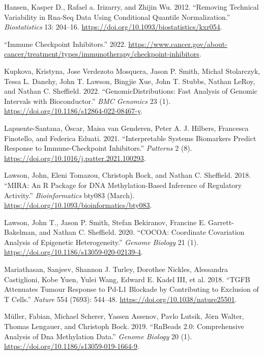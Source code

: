 \documentclass[]{article}
\newlength{\cslhangindent}
\newenvironment{cslreferences}%
  {\setlength{\parindent}{0pt}%
  \everypar{\setlength{\hangindent}{\cslhangindent}}\ignorespaces}%
  {\par}
\begin{document}
\begin{cslreferences}
\leavevmode\hypertarget{ref-Hansen2012}{}%
Hansen, Kasper D., Rafael a. Irizarry, and Zhijin Wu. 2012. ``Removing Technical Variability in Rna-Seq Data Using Conditional Quantile Normalization.'' \emph{Biostatistics} 13: 204--16. \url{https://doi.org/10.1093/biostatistics/kxr054}.

\leavevmode\hypertarget{ref-ICBnci}{}%
``Immune Checkpoint Inhibitors.'' 2022. \url{https://www.cancer.gov/about-cancer/treatment/types/immunotherapy/checkpoint-inhibitors}.

\leavevmode\hypertarget{ref-Kupkova2022}{}%
Kupkova, Kristyna, Jose Verdezoto Mosquera, Jason P. Smith, Michał Stolarczyk, Tessa L. Danehy, John T. Lawson, Bingjie Xue, John T. Stubbs, Nathan LeRoy, and Nathan C. Sheffield. 2022. ``GenomicDistributions: Fast Analysis of Genomic Intervals with Bioconductor.'' \emph{BMC Genomics} 23 (1). \url{https://doi.org/10.1186/s12864-022-08467-y}.

\leavevmode\hypertarget{ref-easierPap}{}%
Lapuente-Santana, Óscar, Maisa van Genderen, Peter A. J. Hilbers, Francesca Finotello, and Federica Eduati. 2021. ``Interpretable Systems Biomarkers Predict Response to Immune-Checkpoint Inhibitors.'' \emph{Patterns} 2 (8). \url{https://doi.org/10.1016/j.patter.2021.100293}.

\leavevmode\hypertarget{ref-Lawson2018}{}%
Lawson, John, Eleni Tomazou, Christoph Bock, and Nathan C. Sheffield. 2018. ``MIRA: An R Package for DNA Methylation-Based Inference of Regulatory Activity.'' \emph{Bioinformatics} bty083 (March). \url{https://doi.org/10.1093/bioinformatics/bty083}.

\leavevmode\hypertarget{ref-Lawson2020}{}%
Lawson, John T., Jason P. Smith, Stefan Bekiranov, Francine E. Garrett-Bakelman, and Nathan C. Sheffield. 2020. ``COCOA: Coordinate Covariation Analysis of Epigenetic Heterogeneity.'' \emph{Genome Biology} 21 (1). \url{https://doi.org/10.1186/s13059-020-02139-4}.

\leavevmode\hypertarget{ref-Mariathasan2018}{}%
Mariathasan, Sanjeev, Shannon J. Turley, Dorothee Nickles, Alessandra Castiglioni, Kobe Yuen, Yulei Wang, Edward E. Kadel III, et al. 2018. ``TGFB Attenuates Tumour Response to Pd-L1 Blockade by Contributing to Exclusion of T Cells.'' \emph{Nature} 554 (7693): 544--48. \url{https://doi.org/10.1038/nature25501}.

\leavevmode\hypertarget{ref-Mueller2019}{}%
Müller, Fabian, Michael Scherer, Yassen Assenov, Pavlo Lutsik, Jörn Walter, Thomas Lengauer, and Christoph Bock. 2019. ``RnBeads 2.0: Comprehensive Analysis of Dna Methylation Data.'' \emph{Genome Biology} 20 (1). \url{https://doi.org/10.1186/s13059-019-1664-9}.


\end{cslreferences}
\end{document}

